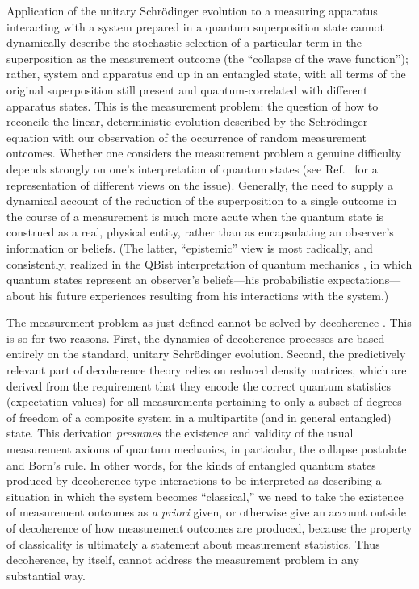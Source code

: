 \documentclass[3p,sort&compress]{elsarticle}
\begin{document}
Application of the unitary Schr\"odinger evolution to a measuring apparatus interacting with a system prepared in a quantum superposition state cannot dynamically describe the stochastic selection of a particular term in the superposition as the measurement outcome (the ``collapse of the wave function''); rather, system and apparatus end up in an entangled state, with all terms of the original superposition still present and quantum-correlated with different apparatus states. This is the measurement problem: the question of how to reconcile the linear, deterministic evolution described by the Schr\"odinger equation with our observation of the occurrence of random measurement outcomes. Whether one considers the measurement problem a genuine difficulty depends strongly on one's interpretation of quantum states (see Ref.~\cite{Schlosshauer:2011:ee} for a representation of different views on the issue). Generally, the need to supply a dynamical account of the reduction of the superposition to a single outcome in the course of a measurement is much more acute when the quantum state is construed as a real, physical entity, rather than as encapsulating an observer's information or beliefs. (The latter, ``epistemic'' view is most radically, and consistently, realized in the QBist interpretation of quantum mechanics \cite{Fuchs:2014:pp}, in which quantum states represent an observer's beliefs---his probabilistic expectations---about his future experiences resulting from his interactions with the system.)

The measurement problem as just defined cannot be solved by decoherence \cite{Schlosshauer:2003:tv,Schlosshauer:2007:un}.  This is so for two reasons. First, the dynamics of decoherence processes are based entirely on the standard, unitary Schr\"odinger evolution. Second, the predictively relevant part of decoherence theory relies on reduced density matrices, which are derived from the requirement that they encode the correct quantum statistics (expectation values) for all measurements pertaining to only a subset of degrees of freedom of a composite system in a multipartite (and in general entangled) state. This derivation \emph{presumes} the existence and validity of the usual measurement axioms of quantum mechanics, in particular, the collapse postulate and Born's rule. In other words, for the kinds of entangled quantum states produced by decoherence-type interactions to be interpreted as describing a situation in which the system becomes ``classical,'' we need to take the existence of measurement outcomes as \emph{a priori} given, or otherwise give an account outside of decoherence of how measurement outcomes are produced, because the property of classicality is ultimately a statement about measurement statistics. Thus decoherence, by itself, cannot address the measurement problem in any substantial way.
\end{document}
